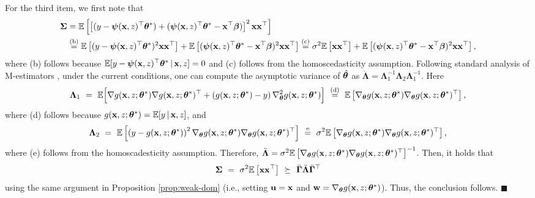{    For the third item, we first note that 
    \begin{align*}
        \bm{\Sigma} &=
\mathbb{E}
\left[
\left[(y - \bm{\psi}(\mathbf{x}, z)^{\top}\bm{\theta}^*) + (\bm{\psi}(\mathbf{x}, z)^{\top} \bm{\theta}^*- \mathbf{x}^{\top}\bm{\beta})\right]^2 \mathbf{x}\mathbf{x}^{\top}
\right]\\
&\stackrel{\text{(b)}}{=}
\mathbb{E}
\left[(y - \bm{\psi}(\mathbf{x}, z)^{\top}\bm{\theta}^*)^2 \mathbf{x}\mathbf{x}^{\top}
\right] + \mathbb{E}
\left[(\bm{\psi}(\mathbf{x}, z)^{\top} \bm{\theta}^*- \mathbf{x}^{\top}\bm{\beta})^2 \mathbf{x}\mathbf{x}^{\top}
\right]\stackrel{\text{(c)}}{=}\sigma^2\mathbb{E}
\left[\mathbf{x}\mathbf{x}^{\top}
\right] + \mathbb{E}
\left[(\bm{\psi}(\mathbf{x}, z)^{\top} \bm{\theta}^*- \mathbf{x}^{\top}\bm{\beta})^2 \mathbf{x}\mathbf{x}^{\top}
\right],
    \end{align*}
where (b) follows because 
$\mathbb{E}[y - \bm{\psi}(\mathbf{x}, z)^{\top} \bm{\theta}^* \,|\, \mathbf{x}, z] = 0$ and (c) follows from the homoscedasticity assumption.
Following standard analysis of M-estimators \citep{newey1994large}, under the current conditions, one can compute the  asymptotic variance of 
$\hat{\bm{\theta}}$ as 
$\ddot{\bm{\Lambda}} = \bm{\Lambda}_1^{-1}\bm{\Lambda}_2  \bm{\Lambda}_1^{-1}$. 
Here
$$
\bm{\Lambda}_1 ~=~ \mathbb{E}\Big[
\nabla g(\mathbf{x}, z; \bm{\theta}^*)\nabla g(\mathbf{x}, z; \bm{\theta}^*)^{\top} + 
\left(g(\mathbf{x}, z; \bm{\theta}^*) - y \right)
\nabla^2_{\bm{\theta}} g(\mathbf{x}, z; \bm{\theta}^*)
\Big]~\stackrel{\text{(d)}}{=}~
\mathbb{E}\left[
\nabla_{\bm{\theta}} g(\mathbf{x}, z; \bm{\theta}^*)\nabla_{\bm{\theta}} g(\mathbf{x}, z; \bm{\theta}^*)^{\top}\right], 
$$
where (d) follows because $g(\mathbf{x}, z; \bm{\theta}^*) = \mathbb{E}[y\,|\,\mathbf{x}, z]$, and 
$$
\bm{\Lambda}_2 ~=~ \mathbb{E}
\left[
\left(y - g(\mathbf{x}, z; \bm{\theta}^*)\right)^2\nabla_{\bm{\theta}} g(\mathbf{x}, z; \bm{\theta}^*)\nabla_{\bm{\theta}} g(\mathbf{x}, z; \bm{\theta}^*)^{\top} 
\right]~\stackrel{\text{e}}{=}~\sigma^2\mathbb{E}
\left[
\nabla_{\bm{\theta}} g(\mathbf{x}, z; \bm{\theta}^*)\nabla_{\bm{\theta}} g(\mathbf{x}, z; \bm{\theta}^*)^{\top}
\right],
$$
where (e) follows from the homoscadesticity assumption. 
Therefore, 
$\ddot{\bm{\Lambda}} =\sigma^2 \mathbb{E}\left[\nabla_{\bm{\theta}} g(\mathbf{x}, z; \bm{\theta}^*)\nabla_{\bm{\theta}} g(\mathbf{x}, z; \bm{\theta}^*)^{\top}\right]^{-1}$. 
Then, it holds that 
$$
\bm{\Sigma} ~=~
\sigma^2\mathbb{E}
\left[\mathbf{x}\mathbf{x}^{\top}
\right] ~\succeq~ \ddot{\bm{\Gamma}}\ddot{\bm{\Lambda}}\ddot{\bm{\Gamma}}^{\top}$$ using the same argument in Proposition  \ref{prop:weak-dom} (i.e., setting $\mathbf{u} = \mathbf{x}$ and $\mathbf{w} = \nabla_{\bm{\theta}} g(\mathbf{x}, z; \bm{\theta}^*)$). 
Thus, the conclusion follows.
\hfill $\blacksquare$
\vspace{3mm}}